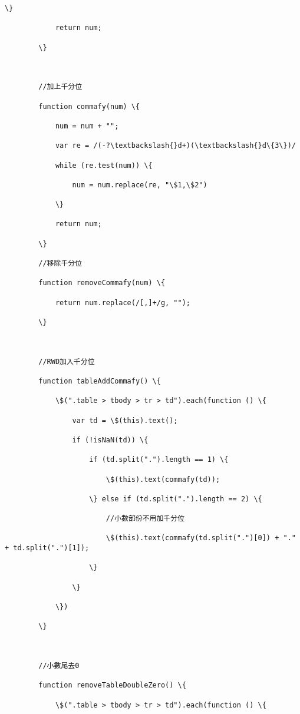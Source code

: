 \documentclass[11pt]{article}
\begin{document}
\begin{Verbatim}[commandchars=\\\{\}]
            \}

            return num;

        \}



        //加上千分位

        function commafy(num) \{

            num = num + "";

            var re = /(-?\textbackslash{}d+)(\textbackslash{}d\{3\})/

            while (re.test(num)) \{

                num = num.replace(re, "\$1,\$2")

            \}

            return num;

        \}

        //移除千分位

        function removeCommafy(num) \{

            return num.replace(/[,]+/g, "");

        \}



        //RWD加入千分位

        function tableAddCommafy() \{

            \$(".table > tbody > tr > td").each(function () \{

                var td = \$(this).text();

                if (!isNaN(td)) \{

                    if (td.split(".").length == 1) \{

                        \$(this).text(commafy(td));

                    \} else if (td.split(".").length == 2) \{

                        //小數部份不用加千分位

                        \$(this).text(commafy(td.split(".")[0]) + "." + td.split(".")[1]);

                    \}

                \}

            \})

        \}



        //小數尾去0

        function removeTableDoubleZero() \{

            \$(".table > tbody > tr > td").each(function () \{


\end{Verbatim}
\end{document}
